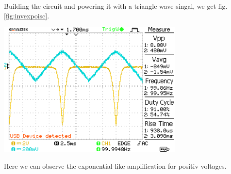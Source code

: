 \documentclass[a4paper,10pt]{article}
\newenvironment{Figure}
        {\par\medskip\noindent\minipage{\linewidth}}
        {\endminipage\par\medskip} %
\numberwithin{equation}{section}
\begin{document}
\begin{multicols}{2}
  Building the circuit and powering it with a triangle wave singal, we get fig. \ref{fig:invexpoisc}.
	\begin{Figure}
		\centering
    \includegraphics[width=0.7\textwidth]{../data/DS0000.png}
    \label{fig:invexpoisc}
	\end{Figure}
  Here we can observe the exponential-like amplification for positiv voltages.

\end{multicols}
\end{document}

